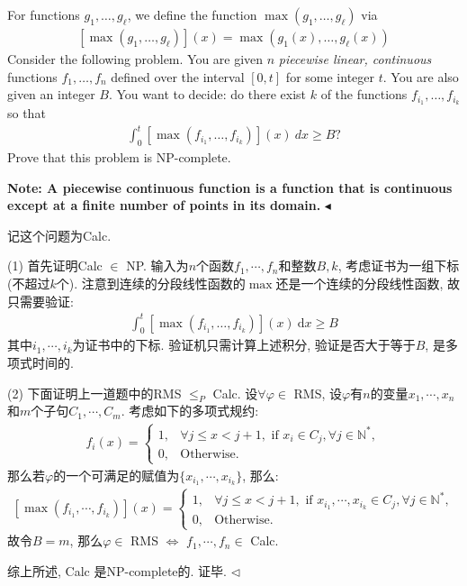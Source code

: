 \documentclass[11pt]{article}
\newenvironment{problem}[2][Problem]{\begin{trivlist}
    \item[\hskip \labelsep{\bfseries#1}\hskip\labelsep{\bfseries#2.}]\mbox{}\newline}{\hfill$\blacktriangleleft$\end{trivlist}}
\newenvironment{answer}[1][Answer]{\begin{trivlist}
\item[\hskip \labelsep{\bfseries\itshape#1.}\hskip \labelsep]}{\hfill$\lhd$\end{trivlist}}
\begin{document}
\begin{problem}{4. (Do some Calculus!)}
    For functions $g_{1}, \ldots, g_{\ell}$, we define the function $\max \left(g_{1}, \ldots, g_{\ell}\right)$ via
\begin{align*}
    \left[\max \left(g_{1}, \ldots, g_{\ell}\right)\right](x)=\max \left(g_{1}(x), \ldots, g_{\ell}(x)\right)
\end{align*}
Consider the following problem. You are given $n$ \textit{piecewise linear, continuous} functions $f_{1}, \ldots, f_{n}$ defined over the interval $[0, t]$ for some integer $t$. You are also given an integer $B$. You want to decide: do there exist $k$ of the functions $f_{i_{1}}, \ldots, f_{i_{k}}$ so that
\begin{align*}
    \int_{0}^{t}\left[\max \left(f_{i_{1}}, \ldots, f_{i_{k}}\right)\right](x)\ dx \geq B ?
\end{align*}
Prove that this problem is NP-complete.

\textbf{Note: A piecewise continuous function is a function that is continuous except at a finite number of points in its domain.}
\end{problem}

\begin{answer}
记这个问题为Calc.

(1) 首先证明Calc $\in$ NP. 输入为$n$个函数$f_1, \cdots, f_n$和整数$B,k$, 考虑证书为一组下标(不超过$k$个). 注意到连续的分段线性函数的$\max$还是一个连续的分段线性函数, 故只需要验证:
\begin{align*}
    \int_{0}^{t}\left[\max \left(f_{i_{1}}, \ldots, f_{i_{k}}\right)\right](x)\ \mathrm{d} x \geq B
\end{align*}
其中$i_1, \cdots, i_k$为证书中的下标. 验证机只需计算上述积分, 验证是否大于等于$B$, 是多项式时间的.

(2) 下面证明上一道题中的RMS $\le_P$ Calc. 设$\forall \varphi \in$ RMS, 设$\varphi$有$n$的变量$x_1,\cdots, x_n$和$m$个子句$C_1, \cdots, C_m$. 考虑如下的多项式规约:
\begin{align*}
    f_{i}(x) = \begin{cases}
        1, &\forall j\le x < j+1, \text{ if $x_i \in C_j, \forall j \in \mathbb{N}^*$}, \\
        0, &\text{Otherwise}. 
    \end{cases}
\end{align*}
那么若$\varphi$的一个可满足的赋值为$\{x_{i_1}, \cdots, x_{i_{k}}\}$, 那么:
\begin{align*}
    \left[\max(f_{i_1}, \cdots, f_{i_k})\right](x) = \begin{cases}
        1, &\forall j\le x < j+1, \text{ if $x_{i_1},\cdots, x_{i_k} \in C_j$}, \forall j \in \mathbb{N}^*, \\
        0, &\text{Otherwise}.
    \end{cases}
\end{align*}  
故令$B = m$, 那么$\varphi \in$ RMS $\iff$ $f_1,\cdots, f_n \in$ Calc.

综上所述, Calc 是NP-complete的. 证毕.
\end{answer}
\end{document}
